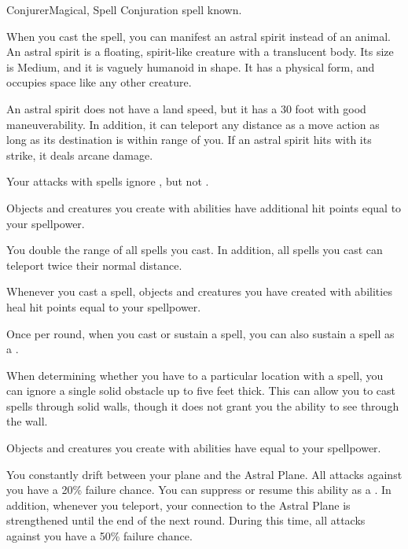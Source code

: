     \begin{feat}{Conjurer}{Magical, Spell}
        \featpre Conjuration spell known.
        \featben

         When you cast the  spell, you can manifest an astral spirit instead of an animal.
        An astral spirit is a floating, spirit-like creature with a translucent body.
        Its size is Medium, and it is vaguely humanoid in shape.
        It has a physical form, and occupies space like any other creature.

        An astral spirit does not have a land speed, but it has a 30 foot  with good maneuverability.
        In addition, it can teleport any distance as a move action as long as its destination is within \rngmed range of you.
        If an astral spirit hits with its strike, it deals arcane damage.

         Your attacks with spells ignore , but not .

         Objects and creatures you create with  abilities have additional hit points equal to your spellpower.

         You double the range of all spells you cast.
        In addition, all  spells you cast can teleport twice their normal distance.

         Whenever you cast a spell, objects and creatures you have created with  abilities heal hit points equal to your spellpower.

         Once per round, when you cast or sustain a spell, you can also sustain a  spell as a .

         When determining whether you have  to a particular location with a spell, you can ignore a single solid obstacle up to five feet thick.
        This can allow you to cast spells through solid walls, though it does not grant you the ability to see through the wall.

         Objects and creatures you create with  abilities have  equal to your spellpower.

        \ff[17]{} 

         You constantly drift between your plane and the Astral Plane.
        All attacks against you have a 20\% failure chance.
        You can suppress or resume this ability as a .
        In addition, whenever you teleport, your connection to the Astral Plane is strengthened until the end of the next round.
        During this time, all attacks against you have a 50\% failure chance.
    \end{feat}


